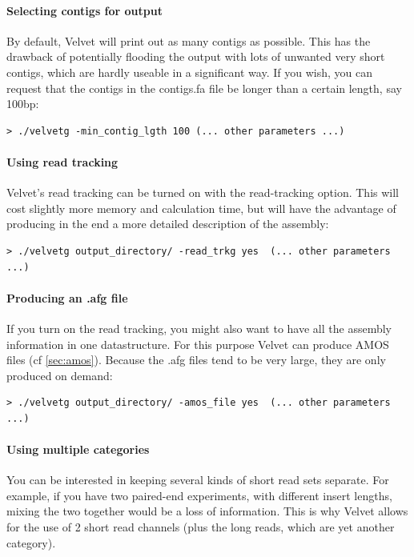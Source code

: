 \documentclass{article}
\begin{document}
	\paragraph{Selecting contigs for output}

By default, Velvet will print out as many contigs as possible. This has the drawback of potentially flooding the output with lots of unwanted very short contigs, which are hardly useable in a significant way. If you wish, you can request that the contigs in the contigs.fa file be longer than a certain length, say 100bp:

\begin{verbatim}
> ./velvetg -min_contig_lgth 100 (... other parameters ...)
\end{verbatim}

	\paragraph{Using read tracking} 
	
Velvet's read tracking can be turned on with the read-tracking option. This will cost slightly more memory and calculation time, but will have the advantage of producing in the end a more detailed description of the assembly:

\begin{verbatim}
> ./velvetg output_directory/ -read_trkg yes  (... other parameters ...)
\end{verbatim}

	\paragraph{Producing an .afg file}
	
If you turn on the read tracking, you might also want to have all the  assembly information in one datastructure. For this purpose Velvet can produce AMOS files (cf \ref{sec:amos}). Because the .afg files tend to be very large, they are only produced on demand:

\begin{verbatim}
> ./velvetg output_directory/ -amos_file yes  (... other parameters ...)
\end{verbatim}

	\paragraph{Using multiple categories}

You can be interested in keeping several kinds of short read sets separate.
For example, if you have two paired-end experiments, with different insert
lengths, mixing the two together would be a loss of information. This is why
Velvet allows for the use of 2 short read channels (plus the long reads, which
are yet another category).
\end{document}
